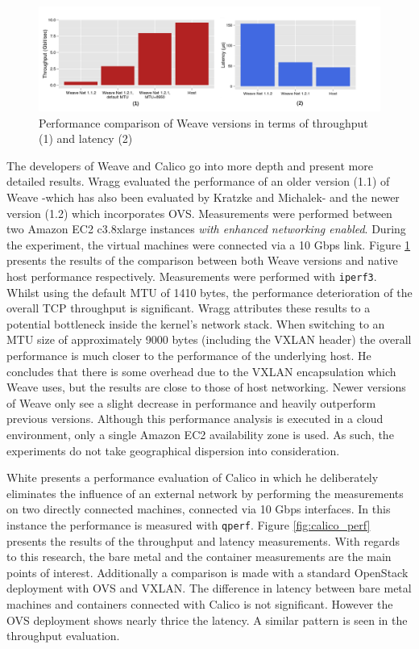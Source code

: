 \begin{figure}[!ht]
	\centering
	\includegraphics[scale=0.37]{img/weave_perf.png}
	\caption {Performance comparison of Weave versions in terms of throughput (1) and latency (2)}
	\label{fig:weave_perf}
\end{figure}

The developers of Weave and Calico go into more depth and present more detailed results. Wragg \cite{davidwragg2015} evaluated the performance of an older version (1.1) of Weave -which has also been evaluated by Kratzke and Michalek- and the newer version (1.2) which incorporates OVS. Measurements were performed between two Amazon EC2 c3.8xlarge instances \textit{with enhanced networking enabled}. During the experiment, the virtual machines were connected via a 10 Gbps link. Figure \ref{fig:weave_perf} presents the results of the comparison between both Weave versions and native host performance respectively.  Measurements were performed with \texttt{iperf3}. Whilst using the default MTU of 1410 bytes, the performance deterioration of the overall TCP throughput is significant. Wragg attributes these results to a potential bottleneck inside the kernel's network stack. When switching to an MTU size of approximately 9000 bytes (including the VXLAN header) the overall performance is much closer to the performance of the underlying host. He concludes that there is some overhead due to the VXLAN encapsulation which Weave uses, but the results are close to those of host networking. Newer versions of Weave only see a slight decrease in performance and heavily outperform previous versions. Although this performance analysis is executed in a cloud environment, only a single Amazon EC2 availability zone is used. As such, the experiments do not take geographical dispersion into consideration.

White \cite{1_white_2015} presents a performance evaluation of Calico in which he deliberately eliminates the influence of an external network by performing the measurements on two directly connected machines, connected via 10 Gbps interfaces. In this instance the performance is measured with \texttt{qperf}. Figure \ref{fig:calico_perf} presents the results of the throughput and latency measurements. With regards to this research, the bare metal and the container measurements are the main points of interest. Additionally a comparison is made with a standard OpenStack deployment with OVS and VXLAN. The difference in latency between bare metal machines and containers connected with Calico is not significant. However the OVS deployment shows nearly thrice the latency. A similar pattern is seen in the throughput evaluation.   

